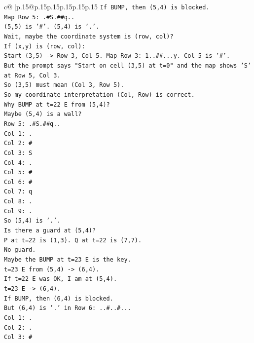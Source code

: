 \documentclass{article}
\begin{document}
{\begin{supertabular}{c@{$\;$}|p{.15\linewidth}@{}p{.15\linewidth}p{.15\linewidth}p{.15\linewidth}p{.15\linewidth}p{.15\linewidth}}
{{{\texttt{If BUMP, then (5,4) is blocked.} \\
\texttt{Map Row 5: .\#S.\#\#q..} \\
\texttt{(5,5) is '\#'. (5,4) is '.'.} \\
\texttt{Wait, maybe the coordinate system is (row, col)?} \\
\texttt{If (x,y) is (row, col):} \\
\texttt{Start (3,5) {-}> Row 3, Col 5. Map Row 3: 1..\#\#...y. Col 5 is '\#'.} \\
\texttt{But the prompt says "Start on cell (3,5) at t=0" and the map shows 'S' at Row 5, Col 3.} \\
\texttt{So (3,5) must mean (Col 3, Row 5).} \\
\texttt{So my coordinate interpretation (Col, Row) is correct.} \\
\texttt{Why BUMP at t=22 E from (5,4)?} \\
\texttt{Maybe (5,4) is a wall?} \\
\texttt{Row 5: .\#S.\#\#q..} \\
\texttt{Col 1: .} \\
\texttt{Col 2: \#} \\
\texttt{Col 3: S} \\
\texttt{Col 4: .} \\
\texttt{Col 5: \#} \\
\texttt{Col 6: \#} \\
\texttt{Col 7: q} \\
\texttt{Col 8: .} \\
\texttt{Col 9: .} \\
\texttt{So (5,4) is '.'.} \\
\texttt{Is there a guard at (5,4)?} \\
\texttt{P at t=22 is (1,3). Q at t=22 is (7,7).} \\
\texttt{No guard.} \\
\texttt{Maybe the BUMP at t=23 E is the key.} \\
\texttt{t=23 E from (5,4) {-}> (6,4).} \\
\texttt{If t=22 E was OK, I am at (5,4).} \\
\texttt{t=23 E {-}> (6,4).} \\
\texttt{If BUMP, then (6,4) is blocked.} \\
\texttt{But (6,4) is '.' in Row 6: ..\#..\#...} \\
\texttt{Col 1: .} \\
\texttt{Col 2: .} \\
\texttt{Col 3: \#} \\
}}}
\end{supertabular}}
\end{document}
